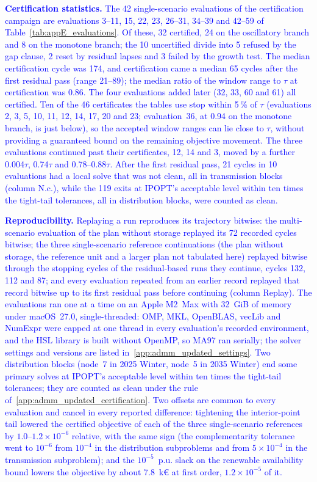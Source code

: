 \textcolor{blue}{
    \textbf{Certification statistics.} The 42 single-scenario evaluations of the certification campaign are evaluations 3--11, 15, 22, 23, 26--31, 34--39 and 42--59 of Table~\ref{tab:appE_evaluations}. Of these, 32 certified, 24 on the oscillatory branch and 8 on the monotone branch; the 10 uncertified divide into 5 refused by the gap clause, 2 reset by residual lapses and 3 failed by the growth test. The median certification cycle was 174, and certification came a median 65 cycles after the first residual pass (range 21--89); the median ratio of the window range to $\tau$ at certification was 0.86. The four evaluations added later (32, 33, 60 and 61) all certified. Ten of the 46 certificates the tables use stop within 5\,\% of $\tau$ (evaluations 2, 3, 5, 10, 11, 12, 14, 17, 20 and 23; evaluation~36, at 0.94 on the monotone branch, is just below), so the accepted window ranges can lie close to $\tau$, without providing a guaranteed bound on the remaining objective movement. The three evaluations continued past their certificates, 12, 14 and 3, moved by a further 0.004$\tau$, 0.74$\tau$ and 0.78--0.88$\tau$. After the first residual pass, 21 cycles in 10 evaluations had a local solve that was not clean, all in transmission blocks (column N.c.), while the 119 exits at IPOPT's acceptable level within ten times the tight-tail tolerances, all in distribution blocks, were counted as clean.
}

\textcolor{blue}{
    \textbf{Reproducibility.} Replaying a run reproduces its trajectory bitwise: the multi-scenario evaluation of the plan without storage replayed its 72 recorded cycles bitwise; the three single-scenario reference continuations (the plan without storage, the reference unit and a larger plan not tabulated here) replayed bitwise through the stopping cycles of the residual-based runs they continue, cycles 132, 112 and 87; and every evaluation repeated from an earlier record replayed that record bitwise up to its first residual pass before continuing (column Replay). The evaluations ran one at a time on an Apple M2~Max with 32~GiB of memory under macOS~27.0, single-threaded: OMP, MKL, OpenBLAS, vecLib and NumExpr were capped at one thread in every evaluation's recorded environment, and the HSL library is built without OpenMP, so MA97 ran serially; the solver settings and versions are listed in~\ref{app:admm_updated_settings}. Two distribution blocks (node~7 in 2025 Winter, node~5 in 2035 Winter) end some primary solves at IPOPT's acceptable level within ten times the tight-tail tolerances; they are counted as clean under the rule of~\ref{app:admm_updated_certification}. Two offsets are common to every evaluation and cancel in every reported difference: tightening the interior-point tail lowered the certified objective of each of the three single-scenario references by $1.0$--$1.2 \times 10^{-6}$ relative, with the same sign (the complementarity tolerance went to $10^{-6}$ from $10^{-4}$ in the distribution subproblems and from $5 \times 10^{-4}$ in the transmission subproblem); and the $10^{-5}$~p.u. slack on the renewable availability bound lowers the objective by about 7.8~k\euro{} at first order, $1.2 \times 10^{-5}$ of it.
}



